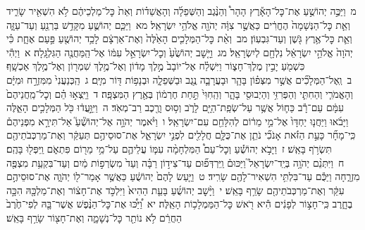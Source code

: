 \documentclass[18pt]{article}
\newcommand{\vart}[1]{\Bfootnote{#1}}	%
\begin{document}
 {\loc מ~}וַיַּכֶּ֣ה יְהוֹשֻׁ֣עַ אֶת־כׇּל־הָאָ֡רֶץ הָהָר֩ וְהַנֶּ֨גֶב וְהַשְּׁפֵלָ֜ה וְהָאֲשֵׁד֗וֹת וְאֵת֙ כׇּל־מַלְכֵיהֶ֔ם לֹ֥א הִשְׁאִ֖יר שָׂרִ֑יד וְאֵ֤ת כׇּל־הַנְּשָׁמָה֙ הֶחֱרִ֔ים כַּאֲשֶׁ֣ר צִוָּ֔ה יְהֹוָ֖ה אֱלֹהֵ֥י יִשְׂרָאֵֽל׃ \startlock
 {\loc מא~}וַיַּכֵּ֧ם יְהוֹשֻׁ֛עַ מִקָּדֵ֥שׁ בַּרְנֵ֖עַ וְעַד־עַזָּ֑ה וְאֵ֛ת כׇּל־אֶ֥רֶץ גֹּ֖שֶׁן וְעַד־גִּבְעֽוֹן׃ \startlock
 {\loc מב~}וְאֵ֨ת כׇּל־הַמְּלָכִ֤ים הָאֵ֙לֶּה֙ וְאֶת־אַרְצָ֔ם לָכַ֥ד יְהוֹשֻׁ֖עַ פַּ֣עַם אֶחָ֑ת כִּ֗י יְהֹוָה֙ אֱלֹהֵ֣י יִשְׂרָאֵ֔ל נִלְחָ֖ם לְיִשְׂרָאֵֽל׃ \startlock
 {\loc מג~}וַיָּ֤שׇׁב יְהוֹשֻׁ֙עַ֙ וְכׇל־יִשְׂרָאֵ֣ל עִמּ֔וֹ אֶל־הַֽמַּחֲנֶ֖ה הַגִּלְגָּֽלָה׃ 
\startlock
 {\loc א~}וַיְהִ֕י כִּשְׁמֹ֖עַ יָבִ֣ין מֶלֶךְ־חָצ֑וֹר וַיִּשְׁלַ֗ח אֶל־יוֹבָב֙ מֶ֣לֶךְ מָד֔וֹן וְאֶל־מֶ֥לֶךְ שִׁמְר֖וֹן וְאֶל־מֶ֥לֶךְ אַכְשָֽׁף׃ \startlock
 {\loc ב~}וְֽאֶל־הַמְּלָכִ֞ים אֲשֶׁ֣ר מִצְּפ֗וֹן בָּהָ֧ר וּבָעֲרָבָ֛ה נֶ֥גֶב  \edtext{כִּֽנְר֖וֹת}{\vart{א=כִּֽנֲר֖וֹת | }}  וּבַשְּׁפֵלָ֑ה וּבְנָפ֥וֹת דּ֖וֹר מִיָּֽם׃ \startlock
 {\loc ג~}הַֽכְּנַעֲנִי֙ מִמִּזְרָ֣ח וּמִיָּ֔ם וְהָאֱמֹרִ֧י וְהַחִתִּ֛י וְהַפְּרִזִּ֥י וְהַיְבוּסִ֖י בָּהָ֑ר וְהַֽחִוִּי֙ תַּ֣חַת חֶרְמ֔וֹן בְּאֶ֖רֶץ הַמִּצְפָּֽה׃ \startlock
 {\loc ד~}וַיֵּֽצְא֣וּ הֵ֗ם וְכׇל־מַֽחֲנֵיהֶם֙ עִמָּ֔ם עַם־רָ֕ב כַּח֛וֹל אֲשֶׁ֥ר עַל־שְׂפַֽת־הַיָּ֖ם לָרֹ֑ב וְס֥וּס וָרֶ֖כֶב רַב־מְאֹֽד׃ \startlock
 {\loc ה~}וַיִּוָּ֣עֲד֔וּ כֹּ֖ל הַמְּלָכִ֣ים הָאֵ֑לֶּה וַיָּבֹ֜אוּ וַיַּחֲנ֤וּ יַחְדָּו֙ אֶל־מֵ֣י מֵר֔וֹם לְהִלָּחֵ֖ם עִם־יִשְׂרָאֵֽל׃ \startlock
 {\loc ו~}וַיֹּ֨אמֶר יְהֹוָ֣ה אֶל־יְהוֹשֻׁ֘עַ֮ אַל־תִּירָ֣א מִפְּנֵיהֶם֒ כִּֽי־מָחָ֞ר כָּעֵ֣ת הַזֹּ֗את אָנֹכִ֞י נֹתֵ֧ן אֶת־כֻּלָּ֛ם חֲלָלִ֖ים לִפְנֵ֣י יִשְׂרָאֵ֑ל אֶת־סוּסֵיהֶ֣ם תְּעַקֵּ֔ר וְאֶת־מַרְכְּבֹתֵיהֶ֖ם תִּשְׂרֹ֥ף בָּאֵֽשׁ׃ \startlock
 {\loc ז~}וַיָּבֹ֣א יְהוֹשֻׁ֡עַ וְכׇל־עַם֩ הַמִּלְחָמָ֨ה עִמּ֧וֹ עֲלֵיהֶ֛ם עַל־מֵ֥י מֵר֖וֹם פִּתְאֹ֑ם וַֽיִּפְּל֖וּ בָּהֶֽם׃ \startlock
 {\loc ח~}וַיִּתְּנֵ֨ם יְהֹוָ֥ה בְּיַֽד־יִשְׂרָאֵל֮ וַיַּכּוּם֒ וַֽיִּרְדְּפ֞וּם עַד־צִיד֣וֹן רַבָּ֗ה וְעַד֙ מִשְׂרְפ֣וֹת מַ֔יִם וְעַד־בִּקְעַ֥ת מִצְפֶּ֖ה מִזְרָ֑חָה וַיַּכֻּ֕ם עַד־בִּלְתִּ֥י הִשְׁאִיר־לָהֶ֖ם שָׂרִֽיד׃ \startlock
 {\loc ט~}וַיַּ֤עַשׂ לָהֶם֙ יְהוֹשֻׁ֔עַ כַּאֲשֶׁ֥ר אָמַר־ל֖וֹ יְהֹוָ֑ה אֶת־סוּסֵיהֶ֣ם עִקֵּ֔ר וְאֶת־מַרְכְּבֹתֵיהֶ֖ם שָׂרַ֥ף בָּאֵֽשׁ׃ \startlock
 {\loc י~}וַיָּ֨שׇׁב יְהוֹשֻׁ֜עַ בָּעֵ֤ת הַהִיא֙ וַיִּלְכֹּ֣ד אֶת־חָצ֔וֹר וְאֶת־מַלְכָּ֖הּ הִכָּ֣ה בֶחָ֑רֶב כִּֽי־חָצ֣וֹר לְפָנִ֔ים הִ֕יא רֹ֖אשׁ כׇּל־הַמַּמְלָכ֥וֹת הָאֵֽלֶּה׃ \startlock
 {\loc יא~}וַ֠יַּכּ֠וּ אֶת־כׇּל־הַנֶּ֨פֶשׁ אֲשֶׁר־בָּ֤הּ לְפִי־חֶ֙רֶב֙ הַחֲרֵ֔ם לֹ֥א נוֹתַ֖ר כׇּל־נְשָׁמָ֑ה וְאֶת־חָצ֖וֹר שָׂרַ֥ף בָּאֵֽשׁ׃ \startlock
\end{document}
